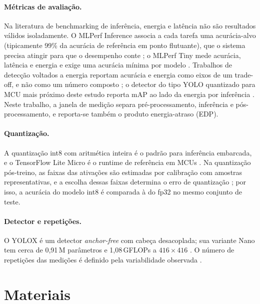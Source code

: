 \documentclass[11pt,a4paper]{article}
\begin{document}
\paragraph{Métricas de avaliação.} Na literatura de benchmarking de inferência, energia e latência não são
resultados válidos isoladamente. O MLPerf Inference associa a cada tarefa uma acurácia-alvo
(tipicamente 99\% da acurácia de referência em ponto flutuante), que o sistema precisa atingir para que o
desempenho conte \cite{reddi2020mlperf}; o MLPerf Tiny mede acurácia, latência e energia e exige uma acurácia
mínima por modelo \cite{banbury2021mlperftiny}. Trabalhos de detecção voltados a energia reportam acurácia e
energia como eixos de um trade-off, e não como um número composto \cite{tu2023femtodet}; o detector do tipo YOLO
quantizado para MCU mais próximo deste estudo reporta mAP ao lado da energia por inferência
\cite{moosmann2023tinyissimoyolo}. Neste trabalho, a janela de medição separa pré-processamento, inferência e
pós-processamento, e reporta-se também o produto energia-atraso (EDP).

\paragraph{Quantização.} A quantização int8 com aritmética inteira \cite{jacob2018quantization} é o padrão
para inferência embarcada, e o TensorFlow Lite Micro é o runtime de referência em MCUs
\cite{david2021tflitemicro}. Na quantização pós-treino, as faixas das ativações são estimadas por calibração com
amostras representativas, e a escolha dessas faixas determina o erro de quantização \cite{gholami2022survey}; por
isso, a acurácia do modelo int8 é comparada à do fp32 no mesmo conjunto de teste.

\paragraph{Detector e repetições.} O YOLOX é um detector \emph{anchor-free} com cabeça desacoplada; sua variante
Nano tem cerca de 0,91\,M parâmetros e 1,08\,GFLOPs a $416\times416$ \cite{megvii_yolox}. O número de repetições
das medições é definido pela variabilidade observada \cite{maricq2018}.

\section{Materiais}
\end{document}
